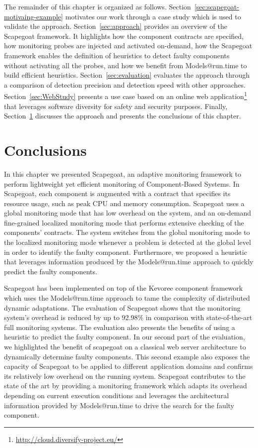 The remainder of this chapter is organized as follows.
Section~\ref{sec:scapegoat-motivaing-example} motivates our work through a case study which is used to validate the approach.
Section~\ref{sec:approach} provides an overview of the Scapegoat framework.
It highlights how the component contracts are specified, how monitoring probes are injected and activated on-demand, how the Scapegoat framework enables the definition of heuristics to detect faulty components without activating all the probes, and how we benefit from Models@run.time to build efficient heuristics.
Section~\ref{sec:evaluation} evaluates the approach through a comparison of detection precision and detection speed with other approaches.
Section~\ref{sec:WebStudy} presents a use case based on an online web application\footnote{\url{http://cloud.diversify-project.eu/}} that leverages software diversity for safety and security purposes.
Finally, Section~\ref{sec:conclusion} discusses the approach and presents the conclusions of this chapter.




%

\section{Conclusions}\label{sec:conclusion}
In this chapter we presented Scapegoat, an adaptive monitoring framework to perform lightweight yet efficient monitoring of Component-Based Systems.
In Scapegoat, each component is augmented with a contract that specifies its resource usage, such as peak CPU and memory consumption.
Scapegoat uses a global monitoring mode that has low overhead on the system, and an on-demand fine-grained localized monitoring mode that performs extensive checking of the components' contracts.
The system switches from the global monitoring mode to the localized monitoring mode whenever a problem is detected at the global level in order to identify the faulty component.
Furthermore, we proposed a heuristic that leverages information produced by the Models@run.time approach to quickly predict the faulty components. 

Scapegoat has been implemented on top of the Kevoree component framework which uses the Models@run.time approach to tame the complexity of distributed dynamic adaptations.
The evaluation of Scapegoat shows that the monitoring system's overhead is reduced by up to 92.98\% in comparison with state-of-the-art full monitoring systems. 
The evaluation also presents the benefits of using a heuristic to predict the faulty component.
In our second part of the evaluation, we highlighted the benefit of scapegoat on a classical web server architecture to dynamically determine faulty components.
This second example also exposes the capacity of Scapegoat to be applied to different application domains and confirms its relatively low overhead on the running system.
Scapegoat contributes to the state of the art by providing a monitoring framework which adapts its overhead depending on current execution conditions and leverages the architectural information provided by Models@run.time to drive the search for the faulty component.

